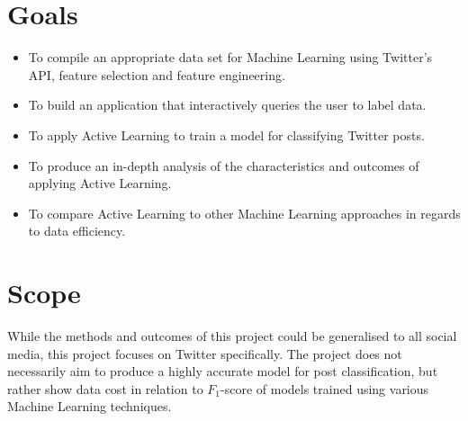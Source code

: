 \documentclass[a4paper,12pt]{article}
\begin{document}
\section*{Goals}
\begin{itemize}
    \item To compile an appropriate data set for Machine Learning using Twitter's API, feature selection and feature engineering.
    \item To build an application that interactively queries the user to label data.
    \item To apply Active Learning to train a model for classifying Twitter posts.
    \item To produce an in-depth analysis of the characteristics and outcomes of applying Active Learning.
    \item To compare Active Learning to other Machine Learning approaches in regards to data efficiency. 
\end{itemize}
\section*{Scope}
While the methods and outcomes of this project could be generalised to all social media, this project focuses on Twitter specifically. The project does not necessarily aim to produce a highly accurate model for post classification, but rather show data cost in relation to $F_1$-score of models trained using various Machine Learning techniques.
\newpage
\end{document}
